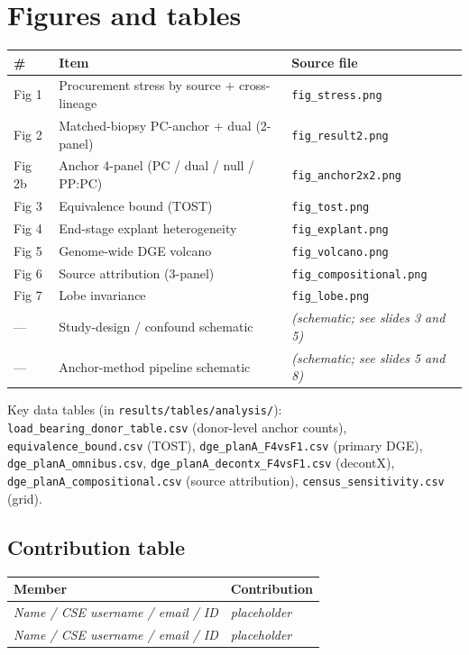 \documentclass[11pt,a4paper]{article}
\begin{document}
\FloatBarrier
\section{Figures and tables}

\begin{table}[h]
\centering\small
\begin{tabular}{lll}
\toprule
\# & Item & Source file \\
\midrule
Fig 1 & Procurement stress by source $+$ cross-lineage & \texttt{fig\_stress.png} \\
Fig 2 & Matched-biopsy PC-anchor $+$ dual (2-panel) & \texttt{fig\_result2.png} \\
Fig 2b & Anchor 4-panel (PC / dual / null / PP:PC) & \texttt{fig\_anchor2x2.png} \\
Fig 3 & Equivalence bound (TOST) & \texttt{fig\_tost.png} \\
Fig 4 & End-stage explant heterogeneity & \texttt{fig\_explant.png} \\
Fig 5 & Genome-wide DGE volcano & \texttt{fig\_volcano.png} \\
Fig 6 & Source attribution (3-panel) & \texttt{fig\_compositional.png} \\
Fig 7 & Lobe invariance & \texttt{fig\_lobe.png} \\
--- & Study-design / confound schematic & \emph{(schematic; see slides 3 and 5)} \\
--- & Anchor-method pipeline schematic & \emph{(schematic; see slides 5 and 8)} \\
\bottomrule
\end{tabular}
\end{table}

Key data tables (in \texttt{results/tables/analysis/}): \texttt{load\_bearing\_donor\_table.csv} (donor-level anchor counts), \texttt{equivalence\_bound.csv} (TOST), \texttt{dge\_planA\_F4vsF1.csv} (primary DGE), \texttt{dge\_planA\_omnibus.csv}, \texttt{dge\_planA\_decontx\_F4vsF1.csv} (decontX), \texttt{dge\_planA\_compositional.csv} (source attribution), \texttt{census\_sensitivity.csv} (grid).

\subsection*{Contribution table}

\begin{table}[h]
\centering\small
\begin{tabular}{ll}
\toprule
Member & Contribution \\
\midrule
\emph{Name / CSE username / email / ID} & \emph{placeholder} \\
\emph{Name / CSE username / email / ID} & \emph{placeholder} \\
\bottomrule
\end{tabular}
\end{table}
\end{document}
